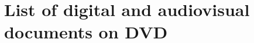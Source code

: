 \documentclass[12pt,twoside,maitrise]{dms_ks}
\theoremstyle{definition}
\begin{document}
{%




\printbibliography


\appendix
\chapter{List of digital and audiovisual documents on DVD}


\begin{itemize}
    \setlength\itemsep{0.5em}  %
    \setlength\parskip{0pt}    %
    \setlength\parsep{0pt}
    \setlength\leftskip{0pt}   %
    \setlength{\labelsep}{0pt} %
    \renewcommand{\labelitemi}{} %
    \renewcommand{\labelitemii}{} %


\end{itemize}}
\end{document}

